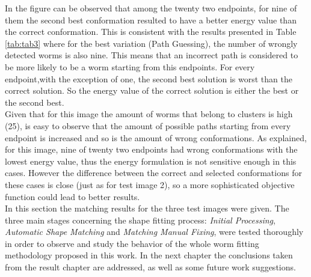 In the figure can be observed that among the twenty two endpoints, for nine
of them the second best conformation resulted to have a better energy value
than the correct conformation. This is consistent with the results presented
in Table \ref{tab:tab3} where for the best variation (Path Guessing), the
number of wrongly detected worms is also nine. This means that an incorrect 
path is considered to be more likely to be a worm starting from this
endpoints. For every endpoint,with the exception of one, the second best 
solution is worst than the correct solution. So the energy value of the 
correct solution is either the best or the second best.\\

Given that for this image the amount of worms that belong to clusters
is high (25), is easy to observe that the amount of possible paths starting
from every endpoint is increased and so is the amount of wrong conformations.
As explained, for this image, nine of twenty two endpoints had wrong 
conformations with the lowest energy value, thus the energy formulation 
is not sensitive enough in this cases. However the difference between
the correct and selected conformations for these cases is close (just as
for test image 2), so a more sophisticated objective function could lead
to better results.\\

In this section the matching results for the three test images were given. 
The three main stages concerning the shape fitting process: 
\emph{Initial Processing}, \emph{Automatic Shape Matching} and 
\emph{Matching Manual Fixing}, were tested thoroughly in order to observe and
study the behavior of the whole worm fitting methodology proposed in this
work. In the next chapter the conclusions taken from the result chapter are
addressed, as well as  some future work suggestions.



